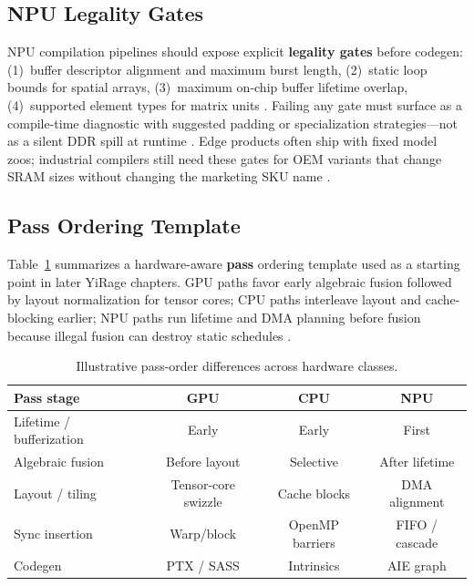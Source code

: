 \subsection{NPU Legality Gates}
\label{sec:ch03_npu_gates}

NPU compilation pipelines should expose explicit \textbf{legality gates} before codegen:
(1)~buffer descriptor alignment and maximum burst length,
(2)~static loop bounds for spatial arrays,
(3)~maximum on-chip buffer lifetime overlap,
(4)~supported element types for matrix units \citep{amd2024aie,amd2024xdna}.
Failing any gate must surface as a compile-time diagnostic with suggested padding or specialization strategies---not as a silent DDR spill at runtime \citep{amd2024xdna}.
Edge products often ship with fixed model zoos; industrial compilers still need these gates for OEM variants that change SRAM sizes without changing the marketing SKU name \citep{amd2024xdna,memoryfloor2026}.

\subsection{Pass Ordering Template}
\label{sec:ch03_pass_template}

Table~\ref{tab:pass_order_template} summarizes a hardware-aware \textbf{pass} ordering template used as a starting point in later YiRage chapters.
GPU paths favor early algebraic fusion followed by layout normalization for tensor cores; CPU paths interleave layout and cache-blocking earlier; NPU paths run lifetime and DMA planning before fusion because illegal fusion can destroy static schedules \citep{amd2024aie,nvidia2022hopper,dlbook}.

\begin{table}[t]
\centering
\caption{Illustrative pass-order differences across hardware classes.}
\label{tab:pass_order_template}
\begin{tabular}{lccc}
\toprule
\textbf{Pass stage} & \textbf{GPU} & \textbf{CPU} & \textbf{NPU} \\
\midrule
Lifetime / bufferization & Early & Early & First \\
Algebraic fusion & Before layout & Selective & After lifetime \\
Layout / tiling & Tensor-core swizzle & Cache blocks & DMA alignment \\
Sync insertion & Warp/block & OpenMP barriers & FIFO / cascade \\
Codegen & PTX / SASS & Intrinsics & AIE graph \\
\bottomrule
\end{tabular}
\end{table}

